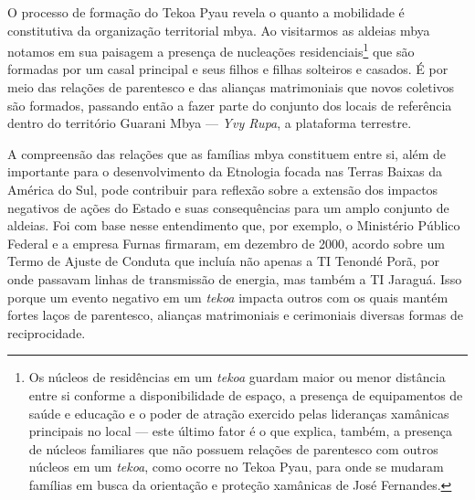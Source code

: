 O processo de formação do Tekoa Pyau revela o quanto a mobilidade é
constitutiva da organização territorial mbya. Ao visitarmos as aldeias
mbya notamos em sua paisagem a presença de nucleações
residenciais\footnote{Os núcleos de residências em um \emph{tekoa}
  guardam maior ou menor distância entre si conforme a disponibilidade
  de espaço, a presença de equipamentos de saúde e educação e o poder de
  atração exercido pelas lideranças xamânicas principais no local ---
  este último fator é o que explica, também, a presença de núcleos
  familiares que não possuem relações de parentesco com outros núcleos
  em um \emph{tekoa}, como ocorre no Tekoa Pyau, para onde se mudaram
  famílias em busca da orientação e proteção xamânicas de José
  Fernandes.} que são formadas por um casal principal e seus filhos e
filhas solteiros e casados. É por meio das relações de parentesco e das
alianças matrimoniais que novos coletivos são formados, passando então a
fazer parte do conjunto dos locais de referência dentro do território
Guarani Mbya --- \emph{Yvy Rupa}, a plataforma terrestre.

A compreensão das relações que as famílias mbya constituem entre si,
além de importante para o desenvolvimento da Etnologia focada nas Terras
Baixas da América do Sul, pode contribuir para reflexão sobre a extensão
dos impactos negativos de ações do Estado e suas consequências para um
amplo conjunto de aldeias. Foi com base nesse entendimento que, por
exemplo, o Ministério Público Federal e a empresa Furnas firmaram, em
dezembro de 2000, acordo sobre um Termo de Ajuste de Conduta que incluía
não apenas a TI Tenondé Porã, por onde passavam linhas de transmissão de
energia, mas também a TI Jaraguá. Isso porque um evento negativo em um
\emph{tekoa} impacta outros com os quais mantém fortes laços de
parentesco, alianças matrimoniais e cerimoniais diversas formas de
reciprocidade.

